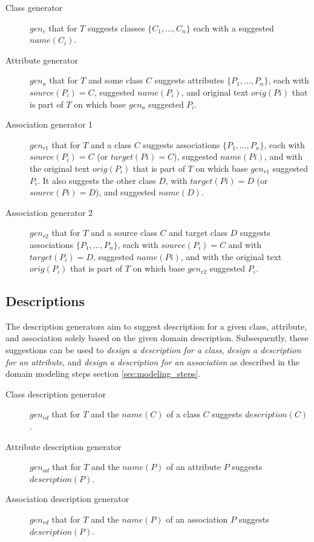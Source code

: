 \begin{description}
\item [Class generator] $gen_c$ that for $T$ suggests classes $\{C_1, \ldots, C_n\}$ each with a suggested $name(C_i)$.

\item [Attribute generator] $gen_a$ that for $T$ and some class $C$ suggests attributes $\{P_1, \ldots, P_n\}$, each with $source(P_i) = C$, suggested $name(P_i)$, and original text $orig(Pi)$ that is part of $T$ on which base $gen_a$ suggested $P_i$.

\item [Association generator 1] $gen_{r1}$ that for $T$ and a class $C$ suggests associations $\{P_1, \ldots, P_n\}$, each with $source(P_i) = C$ (or $target(Pi) = C$), suggested $name(Pi)$, and with the original text $orig(P_i)$ that is part of $T$ on which base $gen_{r1}$ suggested $P_i$. It also suggests the other class $D$, with $target(Pi)= D$ (or $source(Pi) = D$), and suggested $name(D)$.

\item [Association generator 2] $gen_{r2}$ that for $T$ and a source class $C$ and target class $D$ suggests associations $\{P_1, \ldots, P_n\}$, each with $source(P_i) = C$ and with $target(P_i) = D$, suggested $name(Pi)$, and with the original text $orig(P_i)$ that is part of $T$ on which base $gen_{r2}$ suggested $P_i$.
\end{description}


\subsection{Descriptions}

The description generators aim to suggest description for a given class, attribute, and association solely based on the given domain description. Subsequently, these suggestions can be used to \emph{design a description for a class}, \emph{design a description for an attribute}, and \emph{design a description for an association} as described in the domain modeling steps section \ref{sec:modeling_steps}.

\begin{description}
\item [Class description generator] $gen_{cd}$ that for $T$ and the $name(C)$ of a class $C$ suggests $description(C)$.

\item [Attribute description generator] $gen_{ad}$ that for $T$ and the $name(P)$ of an attribute $P$ suggests $description(P)$.

\item [Association description generator] $gen_{rd}$ that for $T$ and the $name(P)$ of an association $P$ suggests $description(P)$.
\end{description}


